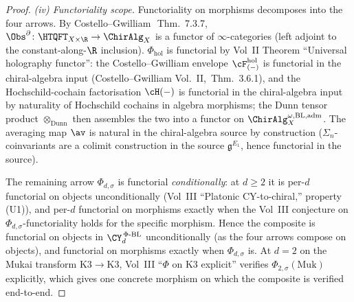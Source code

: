 \begin{proof}
\smallskip
\emph{\textup{(iv)} Functoriality scope.}
Functoriality on morphisms decomposes into the four arrows. By
Costello--Gwilliam~\cite{CG21}\,Thm.~7.3.7,
$\Obs^\partial \colon \HTQFT_{X \times \R} \to \ChirAlg_X$ is a
functor of $\infty$-categories \textup{(}left adjoint to the
constant-along-$\R$ inclusion\textup{).} $\Phi_{\mathrm{hol}}$ is
functorial by Vol~II Theorem ``Universal holography functor'': the
Costello--Gwilliam envelope $\cF^{\mathrm{hol}}_{(-)}$
is functorial in the chiral-algebra input
\textup{(}Costello--Gwilliam Vol.~II,~Thm.~3.6.1\textup{),} and the
Hochschild-cochain factorisation $\cH(-)$ is functorial in the
chiral-algebra input by naturality of Hochschild cochains in
algebra morphisms; the Dunn tensor product
$\otimes_{\mathrm{Dunn}}$ then assembles the two into a functor on
$\ChirAlg^{\omega,\mathrm{BL,adm}}_X$. The averaging map $\av$ is
natural in the chiral-algebra source by construction
\textup{(}$\Sigma_n$-coinvariants are a colimit construction in the
source $\mathfrak{g}^{E_1}$, hence functorial in the
source\textup{).}

The remaining arrow $\Phi_{d,\sigma}$ is functorial \emph{conditionally}:
at $d \geq 2$ it is per-$d$ functorial on objects unconditionally
\textup{(}Vol~III ``Platonic CY-to-chiral,'' property
\textup{(U1)}\textup{),} and per-$d$ functorial on morphisms
exactly when the Vol~III conjecture on $\Phi_{d,\sigma}$-functoriality
holds for the specific morphism. Hence the composite is functorial
on objects in $\CY_d^{\,\Phi\text{-BL}}$ unconditionally
\textup{(}as the four arrows compose on objects\textup{),} and
functorial on morphisms exactly when $\Phi_{d,\sigma}$ is. At $d = 2$ on
the Mukai transform $\mathrm{K3} \to \mathrm{K3}$, Vol~III
``$\Phi$ on K3 explicit'' verifies $\Phi_{2,\sigma}(\mathrm{Muk})$
explicitly, which gives one concrete morphism on which the
composite is verified end-to-end.
\end{proof}


